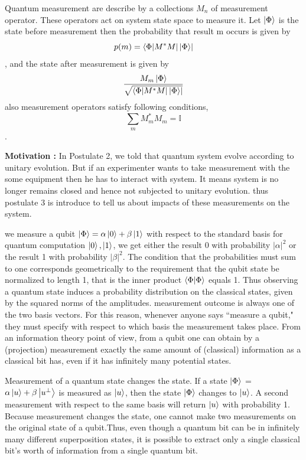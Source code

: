 \documentclass[11 pt]{article}
\theoremstyle{definition}
\theoremstyle{remark}
\begin{document}
Quantum measurement are describe by a collections ${M_n}$ of measurement operator. These operators act on system state space to measure it. Let $\ket{\Phi}$ is the state before measurement then the probability that result m occurs is given by 
$$p(m) = \bra{\Phi|M^{*}M|\ket{\Phi}}$$,
and the state after measurement is given by 
$$ \dfrac{M_m \ket{\Phi}}{\sqrt{\bra{\Phi|M^{*}M|\ket{\Phi}}}}$$
also measurement operators satisfy following conditions,
$$\sum_{m}M_{m}^{*}M_{m} = \mathbb{I}$$.

\textbf{Motivation :} In Postulate 2, we told that quantum system evolve according to unitary evolution. But if an experimenter wants to take measurement with the some equipment then he has to interact with system. It means system is no longer remains closed and hence not subjected to unitary evolution. thus postulate 3 is introduce to tell us about impacts of these measurements on the system.



we measure a qubit 	$\ket{\Phi} = \alpha\ket{0}+\beta\ket{1}$ with respect to the standard basis for quantum computation $\ket{0},\ket{1}$, we get either the result 0 with probability $\left |\alpha\right|^2$ or the result 1 with probability $\left|\beta\right|^2$. The
condition that the probabilities must sum to one corresponds geometrically to the requirement that
the qubit state be normalized to length 1, that is the inner product $\braket{\Phi}$ equals 1.
Thus observing a quantum state induces a probability distribution on the
classical states, given by the squared norms of the amplitudes. measurement outcome is always one of the two basis vectors. For this reason, whenever anyone says “measure a qubit," they must specify with respect to which basis the measurement takes place.
From an
information theory point of view, from a qubit one can obtain by a (projection) measurement
exactly the same amount of (classical) information as a classical bit has, even if it has
infinitely many potential states.

Measurement of a quantum state changes the state. If a state $\ket{\Phi}$ = $\alpha\ket{u} + \beta\ket{u^{\bot}}$ is measured as $\ket{u}$, then the state $\ket{\Phi}$ changes to $\ket{u}$. A second measurement with respect to the same basis will return $\ket{u}$ with probability 1. Because measurement changes the state, one cannot make two measurements on the original state of a qubit.Thus, even though a quantum bit can be in infinitely many different superposition states, it is possible to extract only a single classical bit’s worth of information from a single quantum bit.\newline
\end{document}
